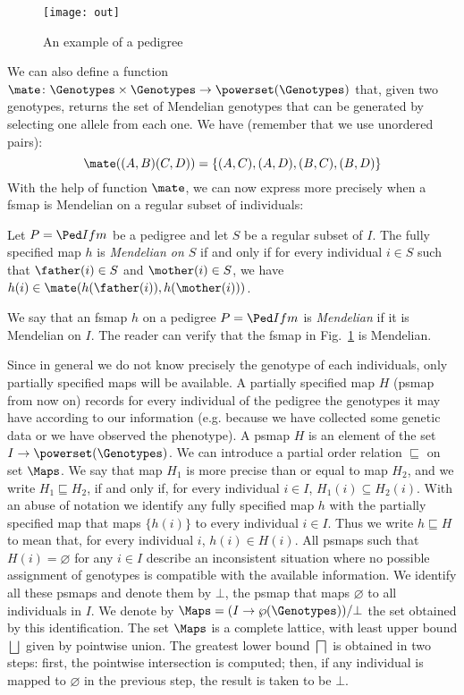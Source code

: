 \begin{figure}
  \centering
  \texttt{[image: out]}
  \caption{An example of a pedigree}
  \label{fig:OUT}
\end{figure}


We can also define a function
$\mate\colon\Genotypes\times\Genotypes\to\powerset(\Genotypes)$ that, given two
genotypes, returns the set of Mendelian genotypes that can be generated by
selecting one allele from each one. We have (remember that we use unordered
pairs):
\begin{displaymath}
  \mate((A,B)(C,D)) = \{(A,C),(A,D), (B,C), (B,D)\}
\end{displaymath}
With the help of function $\mate$, we can now express more precisely when a
fsmap is Mendelian on a regular subset of individuals:
\begin{definition}
  Let $P=\Ped I f m$ be a pedigree and let $S$ be a regular subset of $I$.
  The fully specified map $h$ is {\em Mendelian on $S$} if and only if for every individual
  $i \in S$ such that $\father(i)\in S$ and $\mother(i)\in S$, we have $h(i)\in
  \mate(h(\father(i)),h(\mother(i)))$.
\end{definition}
We say that an fsmap $h$ on a pedigree $P=\Ped I f m$ is {\em Mendelian} if it
is Mendelian on $I$. The reader can verify that the fsmap in Fig.~\ref{fig:OUT} is Mendelian.

Since in general we do not know precisely the genotype of each individuals, only
partially specified maps will be available. A partially specified map $H$ (psmap from now on)
records for every individual of the pedigree the genotypes it may have according
to our information (e.g. because we have collected some genetic data or we have
observed the phenotype). A psmap $H$ is an element of the set
$I\to\powerset(\Genotypes)$. We can introduce a partial
order relation $\sqsubseteq$ on set $\Maps$. We say that map $H_1$
is more precise than or equal to map $H_2$, and we write $H_1 \sqsubseteq H_2 $,
if and only if, for every individual $i\in I$, $H_1(i) \subseteq H_2(i)$.
With an abuse of notation we identify any fully specified map $h$
with the partially specified map that maps $\{h(i)\}$ to every individual
$i\in I$.
Thus we write $h\sqsubseteq H$ to mean that, for every individual $i$, $h(i)\in H(i)$. 
All psmaps such that $H(i) = \varnothing$ for any $i \in I$ describe an inconsistent situation
where no possible assignment of genotypes is compatible with the available information.
We identify all these psmaps and denote them by $\bot$,
the psmap that maps $\varnothing$ to all individuals in $I$.
We denote by $\Maps = (I\to\wp(\Genotypes))/\bot$ the set obtained by this identification.
The set $\Maps$ is a complete lattice, with least upper bound $\bigsqcup$ given
by pointwise union. 
The greatest lower bound $\bigsqcap$ is obtained in two steps: first,
the pointwise intersection is computed; then, if any individual is mapped to $\varnothing$
in the previous step, the result is taken to be $\bot$.

